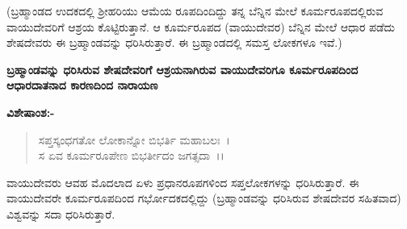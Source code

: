 (ಬ್ರಹ್ಮಾಂಡದ ಉದಕದಲ್ಲಿ ಶ‍್ರೀಹರಿಯು ಆಮೆಯ ರೂಪದಿಂದಿದ್ದು ತನ್ನ ಬೆನ್ನಿನ ಮೇಲೆ ಕೂರ್ಮರೂಪದಲ್ಲಿರುವ ವಾಯುದೇವರಿಗೆ ಆಶ್ರಯ ಕೊಟ್ಟಿರುತ್ತಾನೆ. ಆ ಕೂರ್ಮರೂಪದ (ವಾಯುದೇವರ) ಬೆನ್ನಿನ ಮೇಲೆ ಆಧಾರ ಪಡೆದು ಶೇಷದೇವರು ಈ ಬ್ರಹ್ಮಾಂಡವನ್ನು ಧರಿಸಿರುತ್ತಾರೆ. ಈ ಬ್ರಹ್ಮಾಂಡದಲ್ಲಿ ಸಮಸ್ತ ಲೋಕಗಳೂ ಇವೆ.)

\begin{center}
\textbf{ಬ್ರಹ್ಮಾಂಡವನ್ನು ಧರಿಸಿರುವ ಶೇಷದೇವರಿಗೆ ಆಶ್ರಯನಾಗಿರುವ ವಾಯುದೇವರಿಗೂ ಕೂರ್ಮರೂಪದಿಂದ ಆಧಾರದಾತನಾದ ಕಾರಣದಿಂದ ನಾರಾಯಣ}
\end{center}

\noindent
\textbf{ವಿಶೇಷಾಂಶ:-}

\begin{verse}
ಸಪ್ತಸ್ಕಂಧಗತೋ ಲೋಕಾನ್ನೋ ಬಿಭರ್ತಿ ಮಹಾಬಲಃ~।\\ ಸ ಏವ ಕೂರ್ಮರೂಪೇಣ ಬಿಭರ್ತೀದಂ ಜಗತ್ಸದಾ~।।
\end{verse}


ವಾಯುದೇವರು ಆವಹ ಮೊದಲಾದ ಏಳು ಪ್ರಧಾನರೂಪಗಳಿಂದ ಸಪ್ತಲೋಕಗಳನ್ನು ಧರಿಸಿರುತ್ತಾರೆ. ಈ ವಾಯುದೇವರೇ ಕೂರ್ಮರೂಪದಿಂದ ಗರ್ಭೋದಕದಲ್ಲಿದ್ದು (ಬ್ರಹ್ಮಾಂಡವನ್ನು ಧರಿಸಿರುವ ಶೇಷದೇವರ ಸಹಿತವಾದ) ವಿಶ್ವವನ್ನು ಸದಾ ಧರಿಸಿರುತ್ತಾರೆ.

